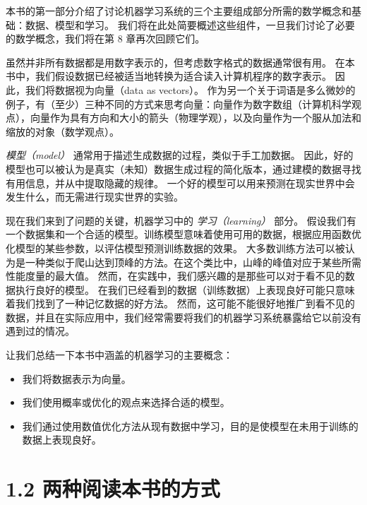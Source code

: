 本书的第一部分介绍了讨论机器学习系统的三个主要组成部分所需的数学概念和基础：数据、模型和学习。 我们将在此处简要概述这些组件，一旦我们讨论了必要的数学概念，我们将在第 8 章再次回顾它们。

虽然并非所有数据都是用数字表示的，但考虑数字格式的数据通常很有用。 在本书中，我们假设数据已经被适当地转换为适合读入计算机程序的数字表示。 因此，我们将数据视为向量（data as vectors）。 作为另一个关于词语是多么微妙的例子，有（至少）三种不同的方式来思考向量：向量作为数字数组（计算机科学观点），向量作为具有方向和大小的箭头（物理学观），以及向量作为一个服从加法和缩放的对象（数学观点）。

\emph{模型（model）} 通常用于描述生成数据的过程，类似于手工加数据。 因此，好的模型也可以被认为是真实（未知）数据生成过程的简化版本，通过建模的数据寻找有用信息，并从中提取隐藏的规律。 一个好的模型可以用来预测在现实世界中会发生什么，而无需进行现实世界的实验。

现在我们来到了问题的关键，机器学习中的 \emph{学习（learning）} 部分。 假设我们有一个数据集和一个合适的模型。训练模型意味着使用可用的数据，根据应用函数优化模型的某些参数，以评估模型预测训练数据的效果。 大多数训练方法可以被认为是一种类似于爬山达到顶峰的方法。在这个类比中，山峰的峰值对应于某些所需性能度量的最大值。 然而，在实践中，我们感兴趣的是那些可以对于看不见的数据执行良好的模型。 在我们已经看到的数据（训练数据）上表现良好可能只意味着我们找到了一种记忆数据的好方法。 然而，这可能不能很好地推广到看不见的数据，并且在实际应用中，我们经常需要将我们的机器学习系统暴露给它以前没有遇到过的情况。

让我们总结一下本书中涵盖的机器学习的主要概念：

\begin{itemize}
\item 我们将数据表示为向量。
\end{itemize}

\begin{itemize}
\item 我们使用概率或优化的观点来选择合适的模型。
\end{itemize}

\begin{itemize}
\item 我们通过使用数值优化方法从现有数据中学习，目的是使模型在未用于训练的数据上表现良好。
\end{itemize}

\section*{1.2 两种阅读本书的方式}
\label{sec:1.2}

